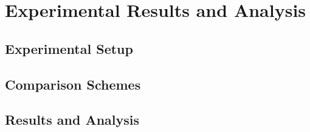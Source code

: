\section{Experimental Results and Analysis}

	\subsection{Experimental Setup}
	\lipsum[1]

	\subsection{Comparison Schemes}
	\lipsum[1]

	\subsection{Results and Analysis}
	\lipsum[1]